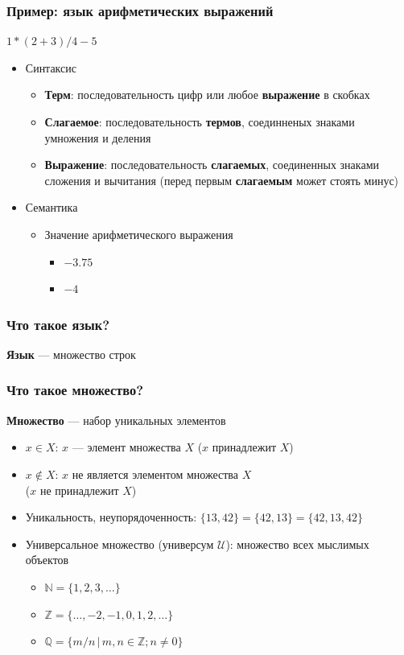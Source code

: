 \documentclass{beamer}
\begin{document}
\begin{frame}[fragile]
  \transwipe[direction=90]
  \frametitle{Пример: язык арифметических выражений}
  $1 * (2 + 3) / 4 - 5$ 
  
  \begin{itemize}
    \item Синтаксис
    \begin{itemize}
      \item \textbf{Терм}: последовательность цифр или любое \textbf{выражение} в скобках
      \item \textbf{Слагаемое}: последовательность \textbf{термов}, соединненых знаками умножения и деления
      \item \textbf{Выражение}: последовательность \textbf{слагаемых}, соединенных знаками сложения и вычитания (перед первым \textbf{слагаемым} может стоять минус)
    \end{itemize}
    \item Семантика
    \begin{itemize}
      \item Значение арифметического выражения
      \pause
      \begin{itemize}
        \item $-3.75$
        \item $-4$
      \end{itemize}
    \end{itemize}
  \end{itemize}
\end{frame}

\begin{frame}[fragile]
  \transwipe[direction=90]
  \frametitle{Что такое язык?}
  \pause
  \textbf{Язык} --- множество строк
\end{frame}

\begin{frame}[fragile]
  \transwipe[direction=90]
  \frametitle{Что такое множество?}
  \pause
  \textbf{Множество} --- набор уникальных элементов
  \pause 
  \begin{itemize}
    \item $x \in X$: $x$ --- элемент множества $X$ ($x$ принадлежит $X$)
    \item $x \notin X$: $x$ не является элементом множества $X$ \\ ($x$ не принадлежит $X$)
    \item Уникальность, неупорядоченность: $\{ 13, 42 \} = \{ 42, 13 \} = \{ 42, 13, 42 \}$
    \item Универсальное множество (универсум $\mathcal{U}$): множество всех мыслимых объектов
    \begin{itemize}
      \item $\mathbb{N} = \{ 1, 2, 3, \dots \}$
      \item $\mathbb{Z} = \{ \dots, -2, -1, 0, 1, 2, \dots \}$
      \item $\mathbb{Q} = \{ m / n \, | \, m, n \in \mathbb{Z}; n \neq 0 \}$
    \end{itemize}
  \end{itemize}
\end{frame}
\end{document}
